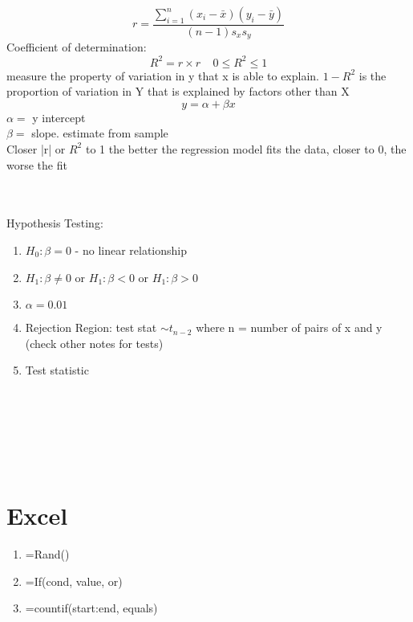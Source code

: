 \documentclass[a4paper,10pt]{article}
\begin{document}
 \[
 	r = \frac{\sum_{i=1}^n(x_i-\bar{x})(y_i-\bar{y})}{(n-1)s_xs_y}
 \]
 Coefficient of determination:
 \[
 	R^2 = r\times r \;\;\;\; 0\leq R^2\leq 1
 \]
 measure the property of variation in y that x is able to explain. $1-R^2$ is the proportion of variation in Y that is explained by factors other than X
 \[
 	y = \alpha + \beta x
 \]
 $\alpha = $ y intercept \\
 $\beta = $ slope. estimate from sample \\
 Closer |r| or $R^2$ to 1 the better the regression model fits the data, closer to 0, the worse the fit
 
 \\ \\
 Hypothesis Testing: 
 \begin{enumerate}
	\item $H_0: \beta = 0$ - no linear relationship 
	\item $H_1: \beta \neq 0$ or $H_1: \beta < 0$ or $H_1: \beta > 0$ 
	\item $\alpha = 0.01$
	\item Rejection Region: test stat $\sim t_{n-2}$ where n = number of pairs of x and y (check other notes for tests)
	\item Test statistic
\end{enumerate}

\\\\\\\\\




\section{Excel}
\begin{enumerate}
	\item =Rand()
	\item =If(cond, value, or)
	\item =countif(start:end, equals)
\end{enumerate}
\end{document}
